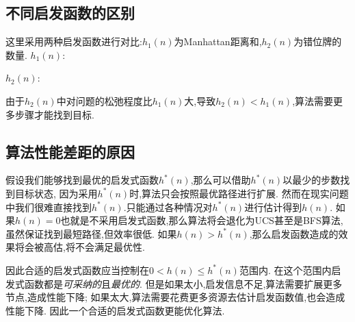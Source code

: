     \subsection{不同启发函数的区别}

    这里采用两种启发函数进行对比:\(h_1(n)\)为Manhattan距离和,\(h_2(n)\)为错位牌的数量.
    \(h_1(n)\):

    
    \(h_2(n)\):


    由于\(h_2(n)\)中对问题的松弛程度比\(h_1(n)\)大,导致\(h_2(n) < h_1(n)\),算法需要更多步骤才能找到目标.

    \subsection{算法性能差距的原因}

    假设我们能够找到最优的启发式函数\(h^*(n)\),那么可以借助\(h^*(n)\)以最少的步数找到目标状态,
    因为采用\(h^*(n)\)时,算法只会按照最优路径进行扩展.
    然而在现实问题中我们很难直接找到\(h^*(n)\).只能通过各种情况对\(h^*(n)\)进行估计得到\(h(n)\).
    如果\(h(n) = 0\)也就是不采用启发式函数,那么算法将会退化为UCS甚至是BFS算法,虽然保证找到最短路径,但效率很低.
    如果\(h(n) > h^*(n)\),那么启发函数造成的效果将会被高估,将不会满足最优性.

    因此合适的启发式函数应当控制在\(0 < h(n) \le h^*(n)\)范围内.
    在这个范围内启发式函数都是\textit{可采纳的}且\textit{最优的}.
    但是如果太小,启发信息不足,算法需要扩展更多节点,造成性能下降;
    如果太大,算法需要花费更多资源去估计启发函数值,也会造成性能下降.
    因此一个合适的启发式函数更能优化算法.

    


